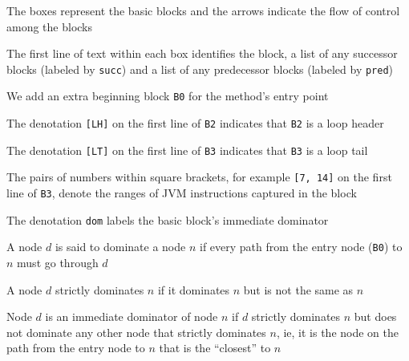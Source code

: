 \documentclass[8pt,a4paper,compress]{beamer}
\begin{document}
\begin{frame}[fragile]
\pause

The boxes represent the basic blocks and the arrows indicate the flow of control among the blocks

\pause
\bigskip

The first line of text within each box identifies the block, a list of any successor blocks (labeled by \lstinline{succ}) and a list of any predecessor blocks (labeled by \lstinline{pred})

\pause
\bigskip

We add an extra beginning block \lstinline{B0} for the method's entry point

\pause
\bigskip

The denotation \lstinline{[LH]} on the first line of \lstinline{B2} indicates that \lstinline{B2} is a loop header

\pause
\bigskip

The denotation \lstinline{[LT]} on the first line of \lstinline{B3} indicates that \lstinline{B3} is a loop tail

\pause
\bigskip

The pairs of numbers within square brackets, for example \lstinline{[7, 14]} on the first line of \lstinline{B3}, denote the ranges of JVM instructions captured in the block

\pause
\bigskip

The denotation \lstinline{dom} labels the basic block's immediate dominator

\pause
\bigskip

A node $d$ is said to dominate a node $n$ if every path from the entry node (\lstinline{B0}) to $n$ must go through $d$

\pause
\bigskip

A node $d$ strictly dominates $n$ if it dominates $n$ but is not the same as $n$

\pause
\bigskip

Node $d$ is an immediate dominator of node $n$ if $d$ strictly dominates $n$ but does not dominate any other node that strictly dominates $n$, ie, it is the node on the path from the entry node to $n$ that is the ``closest'' to $n$
\end{frame}
\end{document}
